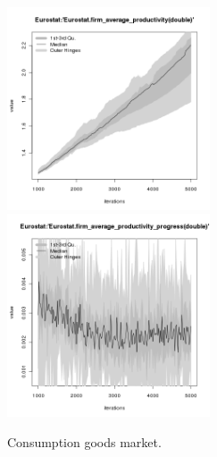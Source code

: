\begin{figure}[H!]
\begin{minipage}{14cm}
\includegraphics[width=6cm]{./png/tax_0.10/Eurostat-firm_average_productivity.png}
\includegraphics[width=6cm]{./png/tax_0.10/Eurostat-firm_average_productivity_progress.png}
\end{minipage}
\caption{Consumption goods market.}
\label{Figure: Consumption Market}
\end{figure}
\clearpage


